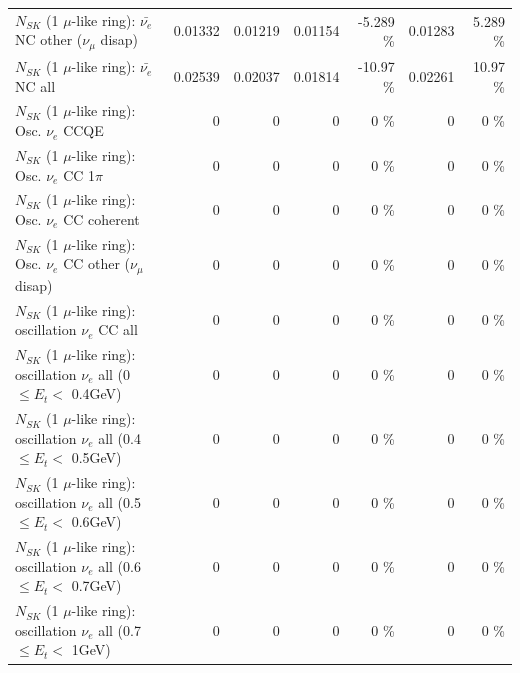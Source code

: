 \begin{table}
\begin{tabular}{| l | r | r | r  r | r  r |}
          $N_{SK}$ (1 $\mu$-like ring): $\bar{\nu_e}$ NC other ($\nu_\mu$ disap) &         0.01332 &         0.01219 &         0.01154 &   -5.289 \%  &         0.01283 &    5.289 \%  \\ 
                            $N_{SK}$ (1 $\mu$-like ring): $\bar{\nu_{e}}$ NC all &         0.02539 &         0.02037 &         0.01814 &   -10.97 \%  &         0.02261 &    10.97 \%  \\ 
\hline
\hline
\hline
                                 $N_{SK}$ (1 $\mu$-like ring): Osc. $\nu_e$ CCQE &               0 &               0 &               0 &        0 \%  &               0 &        0 \%  \\ 
                            $N_{SK}$ (1 $\mu$-like ring): Osc. $\nu_e$ CC 1$\pi$ &               0 &               0 &               0 &        0 \%  &               0 &        0 \%  \\ 
                          $N_{SK}$ (1 $\mu$-like ring): Osc. $\nu_e$ CC coherent &               0 &               0 &               0 &        0 \%  &               0 &        0 \%  \\ 
           $N_{SK}$ (1 $\mu$-like ring): Osc. $\nu_e$ CC other ($\nu_\mu$ disap) &               0 &               0 &               0 &        0 \%  &               0 &        0 \%  \\ 
                        $N_{SK}$ (1 $\mu$-like ring): oscillation $\nu_e$ CC all &               0 &               0 &               0 &        0 \%  &               0 &        0 \%  \\ 
\hline
$N_{SK}$ (1 $\mu$-like ring): oscillation $\nu_{e}$ all (0 $\leq E_{t} <$ 0.4GeV) &               0 &               0 &               0 &        0 \%  &               0 &        0 \%  \\ 
$N_{SK}$ (1 $\mu$-like ring): oscillation $\nu_{e}$ all (0.4 $\leq E_{t} <$ 0.5GeV) &               0 &               0 &               0 &        0 \%  &               0 &        0 \%  \\ 
$N_{SK}$ (1 $\mu$-like ring): oscillation $\nu_{e}$ all (0.5 $\leq E_{t} <$ 0.6GeV) &               0 &               0 &               0 &        0 \%  &               0 &        0 \%  \\ 
$N_{SK}$ (1 $\mu$-like ring): oscillation $\nu_{e}$ all (0.6 $\leq E_{t} <$ 0.7GeV) &               0 &               0 &               0 &        0 \%  &               0 &        0 \%  \\ 
$N_{SK}$ (1 $\mu$-like ring): oscillation $\nu_{e}$ all (0.7 $\leq E_{t} <$ 1GeV) &               0 &               0 &               0 &        0 \%  &               0 &        0 \%  \\ 

\end{tabular}
\end{table}
